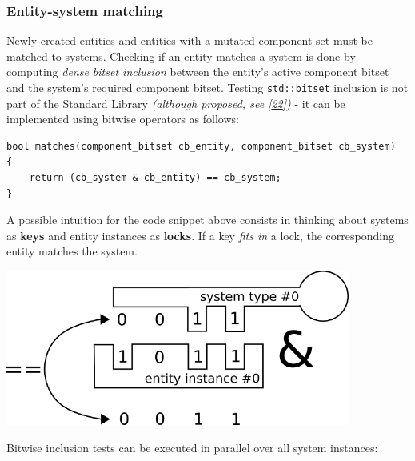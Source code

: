 \documentclass[twoside, 12pt, a4paper, openright]{book}
\let\origfigure=\figure
\let\endorigfigure=\endfigure
\renewenvironment{figure}[1][]{%
\origfigure[H]
}{%
\endorigfigure
}
\begin{document}
\subsubsection{Entity-system matching}\label{entity-system-matching}

Newly created entities and entities with a mutated component set must be
matched to systems. Checking if an entity matches a system is done by
computing \emph{dense bitset inclusion} between the entity's active
component bitset and the system's required component bitset. Testing
\texttt{std::bitset}
inclusion is not part of the Standard Library \emph{(although proposed,
see {[}\protect\hyperlink{ref-isocpp_proposal_p0125r0}{22}{]})} - it can
be implemented using bitwise operators as follows:

\begin{verbatim}
bool matches(component_bitset cb_entity, component_bitset cb_system)
{
    return (cb_system & cb_entity) == cb_system;
}
\end{verbatim}

A possible intuition for the code snippet above consists in thinking
about systems as \textbf{keys} and entity instances as \textbf{locks}.
If a key \emph{fits in} a lock, the corresponding entity matches the
system.

\begin{figure}[htbp]
\centering
\includegraphics[width=0.85000\textwidth]{source/figures/keylock.png}
\caption{ECST flow: key/lock entity/system matching
intuition}\label{keylock}
\end{figure}

Bitwise inclusion tests can be executed in parallel over all system
instances:
\end{document}
